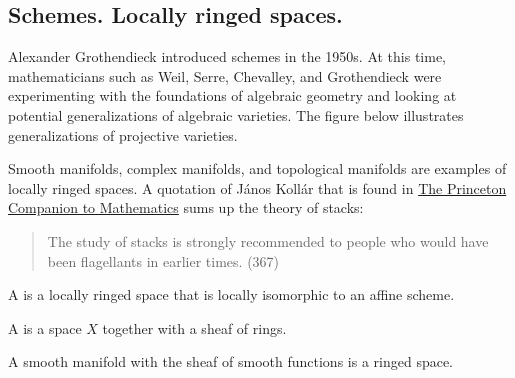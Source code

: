 \documentclass [11 pt, oneside] {article}
\begin{document}
\subsection{Schemes. Locally ringed spaces.}
Alexander Grothendieck introduced schemes in the 1950s. At this time, mathematicians such as Weil, Serre, Chevalley, and Grothendieck were experimenting with the foundations of algebraic geometry and looking at potential generalizations of algebraic varieties. The figure below illustrates generalizations of projective varieties.
\begin{center}
\end{center}

Smooth manifolds, complex manifolds, and topological manifolds are examples of locally ringed spaces.
A quotation of János Kollár that is found in \ul{The Princeton Companion to Mathematics} sums up the theory of stacks: 
\begin{quote}
	\small 
	The study of stacks is strongly recommended to people who would have been flagellants in earlier times. (367)
\end{quote}

\begin{definition}[ ]\label{}\text{}
A  is a locally ringed space that is locally isomorphic to an affine scheme.
\end{definition}

\begin{definition}[ ]\label{}\text{}
A  is a space $X$ together with a sheaf of rings.
\end{definition}

\begin{example}\label{}\text{}
	A smooth manifold with the sheaf of smooth functions is a ringed space.
\end{example}
\end{document}
